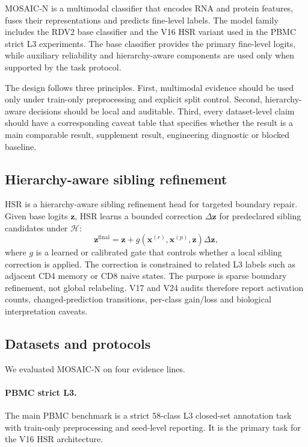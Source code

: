 \documentclass[unnumsec,webpdf,contemporary,large,numbered]{oup-authoring-template}
\begin{document}
MOSAIC-N is a multimodal classifier that encodes RNA and protein features, fuses their representations and predicts fine-level labels. The model family includes the RDV2 base classifier and the V16 HSR variant used in the PBMC strict L3 experiments. The base classifier provides the primary fine-level logits, while auxiliary reliability and hierarchy-aware components are used only when supported by the task protocol.

The design follows three principles. First, multimodal evidence should be used only under train-only preprocessing and explicit split control. Second, hierarchy-aware decisions should be local and auditable. Third, every dataset-level claim should have a corresponding caveat table that specifies whether the result is a main comparable result, supplement result, engineering diagnostic or blocked baseline.

\subsection{Hierarchy-aware sibling refinement}

HSR is a hierarchy-aware sibling refinement head for targeted boundary repair. Given base logits $\mathbf{z}$, HSR learns a bounded correction $\Delta\mathbf{z}$ for predeclared sibling candidates under $\mathcal{H}$:
\begin{equation}
\mathbf{z}^{\mathrm{final}} = \mathbf{z} + g(\mathbf{x}^{(r)}, \mathbf{x}^{(p)}, \mathbf{z}) \Delta\mathbf{z},
\end{equation}
where $g$ is a learned or calibrated gate that controls whether a local sibling correction is applied. The correction is constrained to related L3 labels such as adjacent CD4 memory or CD8 naive states. The purpose is sparse boundary refinement, not global relabeling. V17 and V24 audits therefore report activation counts, changed-prediction transitions, per-class gain/loss and biological interpretation caveats.

\subsection{Datasets and protocols}

We evaluated MOSAIC-N on four evidence lines.

\paragraph{PBMC strict L3.} The main PBMC benchmark is a strict 58-class L3 closed-set annotation task with train-only preprocessing and seed-level reporting. It is the primary task for the V16 HSR architecture.
\end{document}
